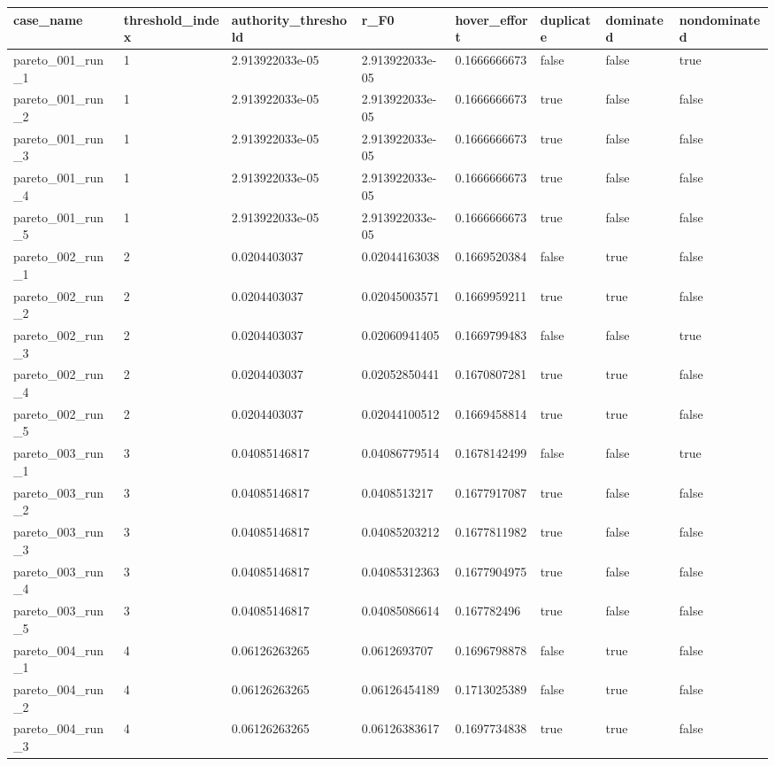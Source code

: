 \begin{tabular}{@{}llllllll@{}}
\toprule
case\_name & threshold\_index & authority\_threshold & r\_F0 & hover\_effort & duplicate & dominated & nondominated \\
\midrule
pareto\_001\_run\_1 & 1 & 2.913922033e-05 & 2.913922033e-05 & 0.1666666673 & false & false & true \\
pareto\_001\_run\_2 & 1 & 2.913922033e-05 & 2.913922033e-05 & 0.1666666673 & true & false & false \\
pareto\_001\_run\_3 & 1 & 2.913922033e-05 & 2.913922033e-05 & 0.1666666673 & true & false & false \\
pareto\_001\_run\_4 & 1 & 2.913922033e-05 & 2.913922033e-05 & 0.1666666673 & true & false & false \\
pareto\_001\_run\_5 & 1 & 2.913922033e-05 & 2.913922033e-05 & 0.1666666673 & true & false & false \\
pareto\_002\_run\_1 & 2 & 0.0204403037 & 0.02044163038 & 0.1669520384 & false & true & false \\
pareto\_002\_run\_2 & 2 & 0.0204403037 & 0.02045003571 & 0.1669959211 & true & true & false \\
pareto\_002\_run\_3 & 2 & 0.0204403037 & 0.02060941405 & 0.1669799483 & false & false & true \\
pareto\_002\_run\_4 & 2 & 0.0204403037 & 0.02052850441 & 0.1670807281 & true & true & false \\
pareto\_002\_run\_5 & 2 & 0.0204403037 & 0.02044100512 & 0.1669458814 & true & true & false \\
pareto\_003\_run\_1 & 3 & 0.04085146817 & 0.04086779514 & 0.1678142499 & false & false & true \\
pareto\_003\_run\_2 & 3 & 0.04085146817 & 0.0408513217 & 0.1677917087 & true & false & false \\
pareto\_003\_run\_3 & 3 & 0.04085146817 & 0.04085203212 & 0.1677811982 & true & false & false \\
pareto\_003\_run\_4 & 3 & 0.04085146817 & 0.04085312363 & 0.1677904975 & true & false & false \\
pareto\_003\_run\_5 & 3 & 0.04085146817 & 0.04085086614 & 0.167782496 & true & false & false \\
pareto\_004\_run\_1 & 4 & 0.06126263265 & 0.0612693707 & 0.1696798878 & false & true & false \\
pareto\_004\_run\_2 & 4 & 0.06126263265 & 0.06126454189 & 0.1713025389 & false & true & false \\
pareto\_004\_run\_3 & 4 & 0.06126263265 & 0.06126383617 & 0.1697734838 & true & true & false \\

\end{tabular}
